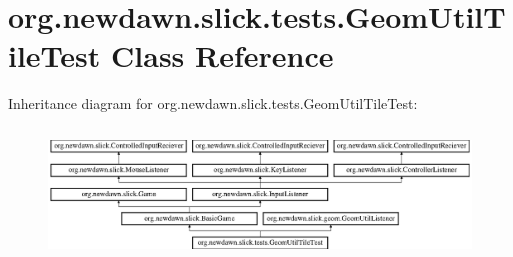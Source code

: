 \hypertarget{classorg_1_1newdawn_1_1slick_1_1tests_1_1_geom_util_tile_test}{}\section{org.\+newdawn.\+slick.\+tests.\+Geom\+Util\+Tile\+Test Class Reference}
\label{classorg_1_1newdawn_1_1slick_1_1tests_1_1_geom_util_tile_test}
Inheritance diagram for org.\+newdawn.\+slick.\+tests.\+Geom\+Util\+Tile\+Test\+:\begin{figure}[H]
\begin{center}
\leavevmode
\includegraphics[height=3.522012cm]{classorg_1_1newdawn_1_1slick_1_1tests_1_1_geom_util_tile_test}
\end{center}
\end{figure}
